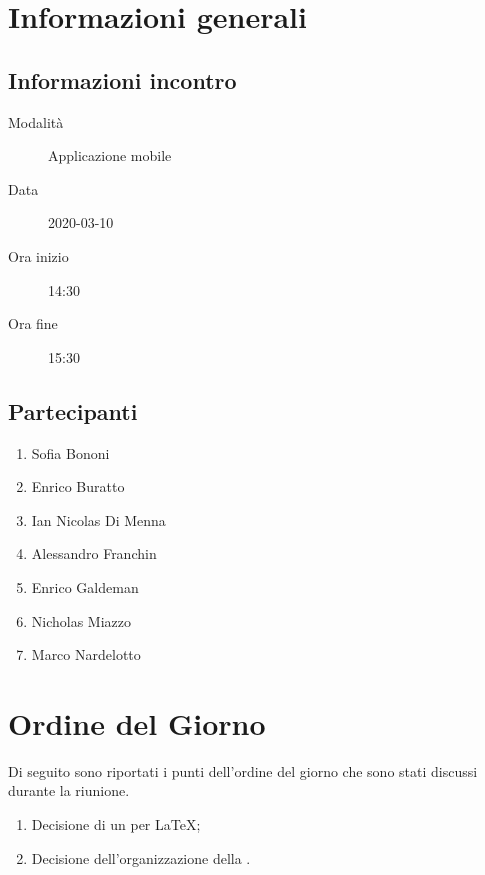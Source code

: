 \documentclass{article}
\begin{document}


\section{Informazioni generali}%
\label{sec:informazioni_generali}

\subsection{Informazioni incontro}%
\label{sub:informazioni_incontro}

\begin{description}
  \item[Modalità] Applicazione mobile 
  \item[Data] 2020-03-10
  \item[Ora inizio] 14:30
  \item[Ora fine] 15:30
\end{description}

\subsection{Partecipanti}%
\label{sub:partecipanti}

\begin{enumerate}
  \item Sofia Bononi
  \item Enrico Buratto
  \item Ian Nicolas Di Menna
  \item Alessandro Franchin
  \item Enrico Galdeman
  \item Nicholas Miazzo
  \item Marco Nardelotto
\end{enumerate}

\section{Ordine del Giorno}%
\label{ordine_del_giorno}
Di seguito sono riportati i punti dell'ordine del giorno che sono stati discussi durante la riunione.
\begin{enumerate}
  \item Decisione di un  per \LaTeX;
  \item Decisione dell'organizzazione della .
\end{enumerate}
\end{document}
